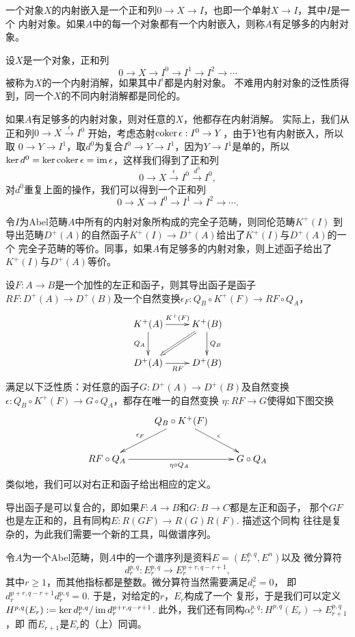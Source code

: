 \begin{para}[内射消解]
    一个对象$X$的内射嵌入是一个正和列$0\to X\to I$，也即一个单射$X\to I$，其中$I$是一个
    内射对象。如果$A$中的每一个对象都有一个内射嵌入，则称$A$有足够多的内射对象。

    设$X$是一个对象，正和列
    \[
        0\to X\to I^0\to I^1\to I^2\to \cdots
    \]
    被称为$X$的一个内射消解，如果其中$I^i$都是内射对象。
    不难用内射对象的泛性质得到，同一个$X$的不同内射消解都是同伦的。

    如果$A$有足够多的内射对象，则对任意的$X$，他都存在内射消解。
    实际上，我们从正和列$0\to X\xrightarrow{\epsilon} I^0$
    开始，考虑态射$\operatorname{coker}\epsilon:I^0\to Y$，由于$Y$也有内射嵌入，所以取
    $0\to Y\to I^1$，取$d^0$为复合$I^0\to Y\to I^1$，因为$Y\to I^1$是单的，所以
    $\ker d^0=\ker \operatorname{coker} \epsilon=\operatorname{im} \epsilon$，这样我们得到了正和列
    \[
        0\to X\xrightarrow{\epsilon} I^0\xrightarrow{d^0} I^0,
    \]
    对$d^0$重复上面的操作，我们可以得到一个正和列
    \[
        0\to X\to I^0\to I^1\to I^2\to \cdots.
    \]
\end{para}

\begin{thm}
令$I$为Abel范畴$A$中所有的内射对象所构成的完全子范畴，则同伦范畴$K^+(I)$
到导出范畴$D^+(A)$的自然函子$K^+(I)\to D^+(A)$给出了$K^+(I)$与$D^+(A)$的一个
完全子范畴的等价。同事，如果$A$有足够多的内射对象，则上述函子给出了
$K^+(I)$与$D^+(A)$等价。
\end{thm}

\begin{para}[导出函子]
设$F:A\to B$是一个加性的左正和函子，则其导出函子是函子
$RF:D^+(A)\to D^+(B)$及一个自然变换$\epsilon_F:Q_B\circ K^+(F)
\to RF\circ Q_A$，
\[
    \xymatrix{
        K^+(A) \ar[r]^{K^+(F)} \ar[d]_{Q_A} & K^+(B) \ar[d]^{Q_B}
        \ar@{=>}[ld] \\
        D^+(A) \ar[r]_{RF} & D^+(B)
    }
\]
满足以下泛性质：对任意的函子$G:D^+(A)\to D^+(B)$及自然变换
$\epsilon:Q_B\circ K^+(F)\to G\circ Q_A$，都存在唯一的自然变换
$\eta:RF\to G$使得如下图交换
\[
    \xymatrix{
        & Q_B\circ K^+(F) \ar[ld]_{\epsilon_F} \ar[rd]^{\epsilon} & \\
        RF\circ Q_A \ar[rr]_{\eta \circ Q_A} & & G\circ Q_A
    }
\]
类似地，我们可以对右正和函子给出相应的定义。
\end{para}

导出函子是可以复合的，即如果$F:A\to B$和$G:B\to C$都是左正和函子，
那个$GF$也是左正和的，且有同构$E:R(GF)\to R(G)R(F)$. 描述这个同构
往往是复杂的，为此我们需要一个新的工具，叫做谱序列。

\begin{para}[谱序列]
令$A$为一个Abel范畴，则$A$中的一个谱序列是资料$E=(E_r^{p,q},E^n)$以及
微分算符
\[
	d_r^{p,q}:E_r^{p,q}\to E_r^{p+r,q-r+1},
\]
其中$r\geq 1$，而其他指标都是整数。微分算符当然需要满足$d_r^2=0$，
即$d_r^{p+r,q-r+1}d_r^{p,q}=0$. 于是，对给定的$r$，$E_r$构成了一个
复形，于是我们可以定义$H^{p,q}(E_r):=\ker d_r^{p,q}/\operatorname{im} d_r^{p+r,q-r+1}$.
此外，我们还有同构$\alpha_r^{p,q}:H^{p,q}(E_r)\to E_{r+1}^{p,q}$，即
而$E_{r+1}$是$E_r$的（上）同调。
\end{para}